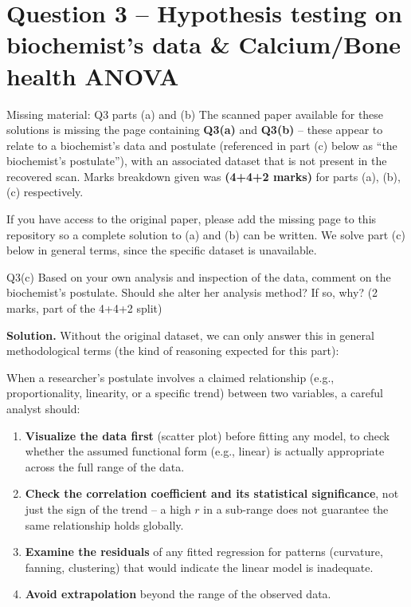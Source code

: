 \documentclass[11pt]{article}
\newcommand{\soln}{\par\noindent\textcolor{acolor}{\textbf{Solution.}}\quad}
\begin{document}
\section{Question 3 -- Hypothesis testing on biochemist's data \& Calcium/Bone health ANOVA}
\begin{gapbox}{Missing material: Q3 parts (a) and (b)}
The scanned paper available for these solutions is missing the page containing \textbf{Q3(a)} and \textbf{Q3(b)} -- these appear to relate to a biochemist's data and postulate (referenced in part (c) below as ``the biochemist's postulate''), with an associated dataset that is not present in the recovered scan. Marks breakdown given was \textbf{(4+4+2 marks)} for parts (a), (b), (c) respectively.

If you have access to the original paper, please add the missing page to this repository so a complete solution to (a) and (b) can be written. We solve part (c) below in general terms, since the specific dataset is unavailable.
\end{gapbox}

\begin{question}{Q3(c)}
Based on your own analysis and inspection of the data, comment on the biochemist's postulate. Should she alter her analysis method? If so, why? (2 marks, part of the 4+4+2 split)
\end{question}

\soln
Without the original dataset, we can only answer this in general methodological terms (the kind of reasoning expected for this part):

When a researcher's postulate involves a claimed relationship (e.g., proportionality, linearity, or a specific trend) between two variables, a careful analyst should:
\begin{enumerate}
\item \textbf{Visualize the data first} (scatter plot) before fitting any model, to check whether the assumed functional form (e.g., linear) is actually appropriate across the full range of the data.
\item \textbf{Check the correlation coefficient and its statistical significance}, not just the sign of the trend -- a high $r$ in a sub-range does not guarantee the same relationship holds globally.
\item \textbf{Examine the residuals} of any fitted regression for patterns (curvature, fanning, clustering) that would indicate the linear model is inadequate.
\item \textbf{Avoid extrapolation} beyond the range of the observed data.
\end{enumerate}
\end{document}
